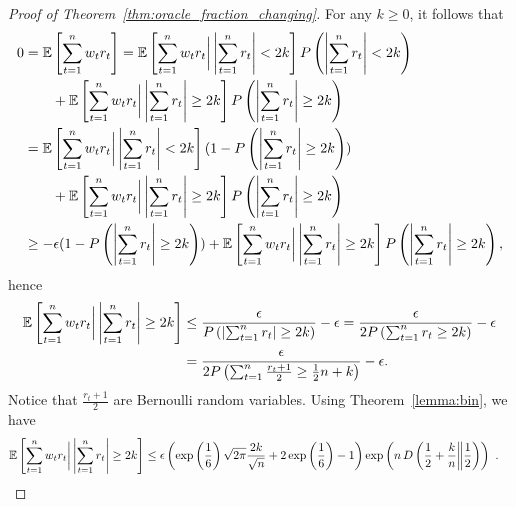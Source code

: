 \begin{proof}[Proof of Theorem~\ref{thm:oracle_fraction_changing}]
For any $k\geq 0$, it follows that
\begin{align*}
0&=\mathbb{E}\left[\sum_{t=1}^n w_t r_t \right] 
= \mathbb{E}\left[\sum_{t=1}^n w_t r_t \bigg| \left|\sum_{t=1}^n r_t \right|< 2 k\right] P\left(\left|\sum_{t=1}^n r_t\right|< 2k \right)\\
&\qquad+\mathbb{E}\left[\sum_{t=1}^n w_t r_t \bigg| \left|\sum_{t=1}^n r_t \right| \geq 2 k\right] P\left(\left|\sum_{t=1}^n r_t\right|\geq 2 k\right) \\
&=\mathbb{E}\left[\sum_{t=1}^n w_t r_t \bigg| \left|\sum_{t=1}^n r_t \right|< 2 k\right] (1-P\left(\left|\sum_{t=1}^n r_t\right|\geq 2 k\right))\\
&\qquad+\mathbb{E}\left[\sum_{t=1}^n w_t r_t \bigg| \left|\sum_{t=1}^n r_t \right| \geq 2 k\right] P\left(\left|\sum_{t=1}^n r_t\right|\geq 2 k\right) \\
&\geq -\epsilon (1-P\left(\left|\sum_{t=1}^n r_t\right|\geq 2 k\right))+\mathbb{E}\left[\sum_{t=1}^n w_t r_t \bigg| \left|\sum_{t=1}^n r_t\right| \geq 2 k\right] P\left(\left|\sum_{t=1}^n r_t \right|\geq 2 k\right),
\end{align*}
hence
\begin{align*}
\mathbb{E}\left[\sum_{t=1}^n w_t r_t \bigg| \left|\sum_{t=1}^n r_t\right| \geq 2 k\right]
&\leq \frac{\epsilon}{P\left(\left|\sum_{t=1}^n r_t\right|\geq 2 k\right)} -\epsilon
= \frac{\epsilon}{2 P\left(\sum_{t=1}^n r_t \geq 2 k\right)} -\epsilon\\
&= \frac{\epsilon}{2 P\left(\sum_{t=1}^n \frac{r_t + 1}{2} \geq \frac{1}{2}n+ k \right)}-\epsilon.
\end{align*}
Notice that $\frac{r_t + 1}{2}$ are Bernoulli random variables.
Using Theorem~\ref{lemma:bin}, we have
\begin{align*}
\mathbb{E}\left[\sum_{t=1}^n w_t r_t \bigg| \left|\sum_{t=1}^n r_t\right| \geq 2 k\right]
&\leq \epsilon \left(\exp\left(\frac{1}{6}\right)\sqrt{2 \pi}\frac{2k}{\sqrt{n}} +2\exp\left(\frac{1}{6}\right)-1\right)\exp\left(n \, D\left(\frac{1}{2}+\frac{k}{n}\middle\|\frac{1}{2}\right)\right)~. \qedhere
\end{align*}
\end{proof}


